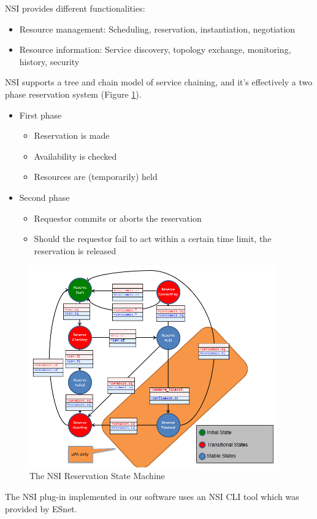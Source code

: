 NSI provides different functionalities:
\begin{itemize}
  \item Resource management: Scheduling, reservation, instantiation, negotiation
  \item Resource information: Service discovery, topology exchange, monitoring, history, security
\end{itemize}

NSI\cite{NSI-CS2} supports a tree and chain model of service chaining, and it's effectively a two 
phase reservation system (Figure \ref{fig:NSI_RSM}).

\begin{itemize}
  \item First phase
	\begin{itemize}
		\item Reservation is made
		\item Availability is checked
		\item Resources are (temporarily) held
	\end{itemize}
  \item Second phase
	\begin{itemize}
		\item Requestor commits or aborts the reservation
		\item Should the requestor fail to act within a certain time limit, the reservation is released
	\end{itemize}
\end{itemize}

\begin{figure}[h]
  \centering
  \includegraphics[width=0.95\textwidth]{Figures/NSI_RSM.png}
  \caption{The NSI Reservation State Machine}
  \label{fig:NSI_RSM}
\end{figure} 

The NSI plug-in implemented in our software uses an NSI CLI tool which was provided by ESnet.
